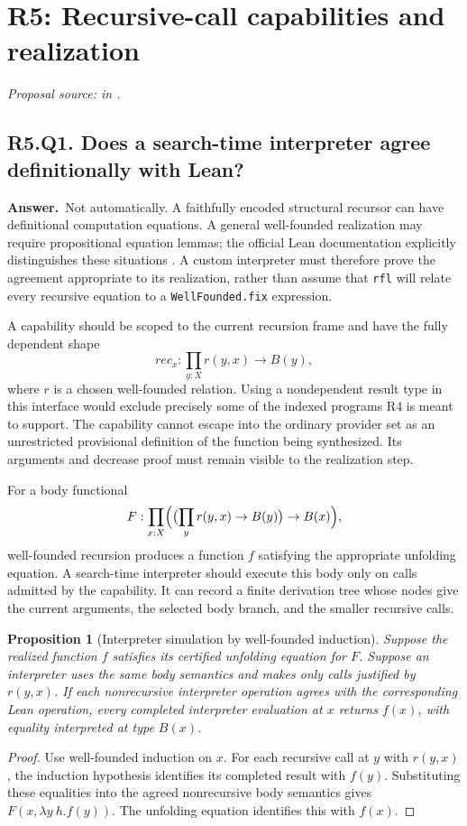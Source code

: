 \documentclass[11pt,a4paper]{article}
\newtheorem{proposition}[theorem]{Proposition}
\theoremstyle{definition}
\theoremstyle{remark}
\newcommand{\code}[1]{\texttt{#1}}
\newcommand{\answer}{\par\noindent\textbf{Answer.}\ }
\newcommand{\sourcepart}[1]{\par\noindent\textit{Proposal source: #1 in \cite{proposal}.}}
\newcommand{\qheading}[2]{\subsection{#1. #2}}
\begin{document}
\section{R5: Recursive-call capabilities and realization}
\label{sec:r5}
\sourcepart{}

\qheading{R5.Q1}{Does a search-time interpreter agree definitionally with Lean?}
\answer Not automatically. A faithfully encoded structural recursor can have
definitional computation equations. A general well-founded realization may
require propositional equation lemmas; the official Lean documentation
explicitly distinguishes these situations \cite{leandefs}. A custom interpreter
must therefore prove the agreement appropriate to its realization, rather than
assume that \code{rfl} will relate every recursive equation to a
\code{WellFounded.fix} expression.

A capability should be scoped to the current recursion frame and have the
fully dependent shape
\[
 \mathit{rec}_x : \prod_{y:X} r(y,x)\to B(y),
 \tag{15}\label{eq:capability}
\]
where $r$ is a chosen well-founded relation. Using a nondependent result type
in this interface would exclude precisely some of the indexed programs R4
is meant to support. The capability cannot escape into the ordinary provider
set as an unrestricted provisional definition of the function being synthesized.
Its arguments and decrease proof must remain visible to the realization step.

For a body functional
\[
 F:\prod_{x:X}\Bigl(\bigl(\prod_y r(y,x)\to B(y)\bigr)\to B(x)\Bigr),
\]
well-founded recursion produces a function $f$ satisfying the appropriate
unfolding equation. A search-time interpreter should execute this body only
on calls admitted by the capability. It can record a finite derivation tree
whose nodes give the current arguments, the selected body branch, and the
smaller recursive calls.

\begin{proposition}[Interpreter simulation by well-founded induction]
Suppose the realized function $f$ satisfies its certified unfolding equation
for $F$. Suppose an interpreter uses the same body semantics and makes only
calls justified by $r(y,x)$. If each nonrecursive interpreter operation agrees
with the corresponding Lean operation, every completed interpreter evaluation
at $x$ returns $f(x)$, with equality interpreted at type $B(x)$.
\end{proposition}
\begin{proof}
Use well-founded induction on $x$. For each recursive call at $y$ with
$r(y,x)$, the induction hypothesis identifies its completed result with $f(y)$.
Substituting these equalities into the agreed nonrecursive body semantics gives
$F(x,\lambda y\ h. f(y))$. The unfolding equation identifies this with $f(x)$.
\end{proof}
\end{document}
